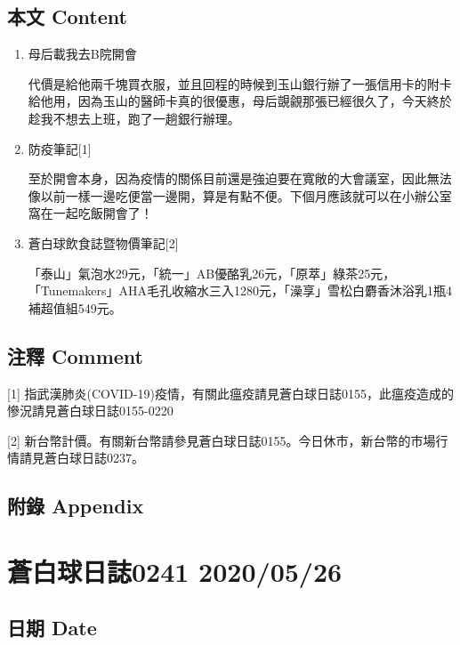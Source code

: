 \documentclass[a5paper, 12pt
]{book}
\begin{document}
\hypertarget{ux672cux6587-content-85}{%
\subsection{本文 Content}\label{ux672cux6587-content-85}}

\begin{enumerate}
\def\labelenumi{\arabic{enumi}.}
\item
  母后載我去B院開會

  代價是給他兩千塊買衣服，並且回程的時候到玉山銀行辦了一張信用卡的附卡給他用，因為玉山的醫師卡真的很優惠，母后覬覦那張已經很久了，今天終於趁我不想去上班，跑了一趟銀行辦理。
\item
  防疫筆記{[}1{]}

  至於開會本身，因為疫情的關係目前還是強迫要在寬敞的大會議室，因此無法像以前一樣一邊吃便當一邊開，算是有點不便。下個月應該就可以在小辦公室窩在一起吃飯開會了！
\item
  蒼白球飲食誌暨物價筆記{[}2{]}

  「泰山」氣泡水29元，「統一」AB優酪乳26元，「原萃」綠茶25元，「Tunemakers」AHA毛孔收縮水三入1280元，「澡享」雪松白麝香沐浴乳1瓶4補超值組549元。
\end{enumerate}

\hypertarget{ux6ce8ux91cb-comment-85}{%
\subsection{注釋 Comment}\label{ux6ce8ux91cb-comment-85}}

{[}1{]}
指武漢肺炎(COVID-19)疫情，有關此瘟疫請見蒼白球日誌0155，此瘟疫造成的慘況請見蒼白球日誌0155-0220

{[}2{]}
新台幣計價。有關新台幣請參見蒼白球日誌0155。今日休市，新台幣的市場行情請見蒼白球日誌0237。

\hypertarget{ux9644ux9304-appendix-85}{%
\subsection{附錄 Appendix}\label{ux9644ux9304-appendix-85}}

\hypertarget{ux84bcux767dux7403ux65e5ux8a8c0241-20200526}{%
\section{蒼白球日誌0241
2020/05/26}\label{ux84bcux767dux7403ux65e5ux8a8c0241-20200526}}

\hypertarget{ux65e5ux671f-date-86}{%
\subsection{日期 Date}\label{ux65e5ux671f-date-86}}
\end{document}
